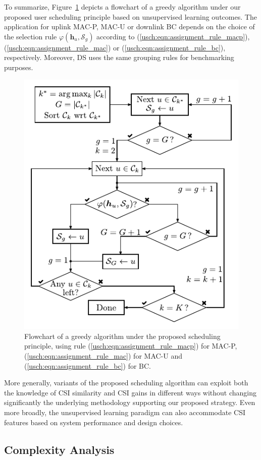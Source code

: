 To summarize, Figure~\ref{usch:fig:similarity_assisted_scheduling} depicts a flowchart of a greedy algorithm under our proposed user scheduling principle based on unsupervised learning outcomes. 
The application for uplink MAC-P, MAC-U or downlink BC depends on the choice of the 
selection rule $\varphi(\bm{h}_u,\mathcal{S}_g)$ 
according to (\ref{usch:eqn:assignment_rule_macp}), (\ref{usch:eqn:assignment_rule_mac}) or (\ref{usch:eqn:assignment_rule_bc}), respectively. Moreover, DS uses the same grouping rules for benchmarking purposes.
\begin{figure}[tbp]
\centering
\includegraphics[width=.56\linewidth]{./figs/usch_figs/ClusterAssitedSchedulingAlgorithm.pdf}
\caption[Flowchart of a greedy algorithm under the proposed scheduling principle.]{Flowchart of a greedy algorithm under the proposed scheduling principle, using rule (\ref{usch:eqn:assignment_rule_macp}) for MAC-P, (\ref{usch:eqn:assignment_rule_mac}) for MAC-U and (\ref{usch:eqn:assignment_rule_bc}) for BC.}
\label{usch:fig:similarity_assisted_scheduling}
\end{figure}

More generally, variants of the proposed scheduling algorithm can exploit both the knowledge of CSI similarity and CSI gains in different ways without changing significantly the underlying methodology supporting our proposed strategy. 
Even more broadly, the unsupervised learning paradigm can also accommodate CSI features based on system performance and design choices. 

\subsection{Complexity Analysis}
